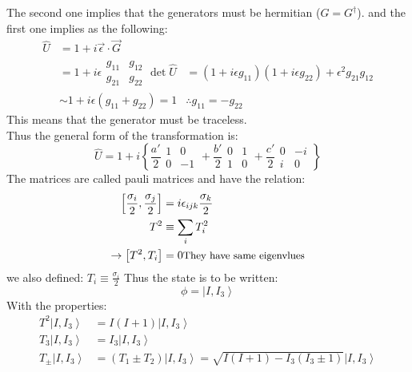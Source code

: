 \documentclass[10pt,a4paper]{article}
\newcommand{\ket}[1]{\left\vert #1 \right\rangle}
\begin{document}
     The second one implies that the generators must be hermitian ($ G = G^\dagger$). and the first one implies as the following:
     \begin{align*}
          \hat U &= 1 + i\vec \epsilon \cdot\vec  G 
          \\
          &= 1+i\epsilon \begin{matrix}
               g_{11} & g_{12} \\
               g_{21} & g_{22}
          \end{matrix}
          \det \hat U & = (1+ i\epsilon g_{11})(1+ i\epsilon g_{22}) + \epsilon^2 g_{21}g_{12}\\
          &\sim 1 + i\epsilon(g_{11} + g_{22}) =1
          &\therefore g_{11} = - g_{22}
     \end{align*}
     This means that the generator must be traceless.
     \\ Thus the general form of the transformation is:
     \begin{equation}
          \hat U = 1 + i \left\{ \frac{a'}{2} \begin{matrix} 1 & 0 \\ 0 & -1\end{matrix} + \frac{b'}{2} \begin{matrix} 0 & 1 \\ 1 & 0\end{matrix} + \frac{c'}{2}\begin{matrix}0 & -i \\ i & 0 \end{matrix}
          \right\}
     \end{equation}
     The matrices are called pauli matrices and have the relation:
     \begin{align}
          \left[ \frac{\sigma_i}{2} , \frac{\sigma_j}{2} \right] &=  i\epsilon_{ijk} \frac{\sigma_k}{2}\\
          T^2 &\equiv \sum_i T_i^2\\
          \rightarrow \left[ T^2 , T_i\right] &= 0\text{\small They have same eigenvlues}          
     \end{align}
     we also defined: $ T_i \equiv \frac{\sigma_i}{2}$ Thus the state is to be written:
     \begin{equation}
          \phi = \ket{I,I_3}
     \end{equation}
     With the properties:
     \begin{align}
          T^2 \ket{I, I_3} &= I(I+1) \ket{I,I_3}\\
          T_3 \ket{I, I_3} &= I_3 \ket{I, I_3} \\
          T_{\pm} \ket{I,I_3} &= (T_1 \pm T_2)\ket{I,I_3} = \sqrt{I(I+1) - I_3(I_3 \pm 1)} \ket{I,I_3}
     \end{align}
\end{document}
